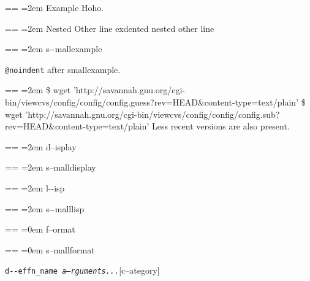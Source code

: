 \documentclass{book}
\makeatletter
\newenvironment{GNUTexinfopreformatted}{%
  \par\obeylines\obeyspaces\frenchspacing
  \parskip=\z@\parindent=\z@}{}
\makeatother
\begin{document}
\begin{titlepage}
\begin{GNUTexinfopreformatted}
\leftskip=2em\relax\ttfamily%
Example   Hoho.
\end{GNUTexinfopreformatted}
\begin{GNUTexinfopreformatted}
\leftskip=2em\relax\ttfamily%
Nested Other line
\end{GNUTexinfopreformatted}
\noindent exdented nested other line

\begin{GNUTexinfopreformatted}
\leftskip=2em\relax\ttfamily\footnotesize%
s{-}{-}mallexample
\end{GNUTexinfopreformatted}

\texttt{@noindent} after smallexample.
\begin{GNUTexinfopreformatted}
\leftskip=2em\relax\ttfamily\footnotesize%
\$ wget 'http://savannah.gnu.org/cgi-bin/viewcvs/config/config/config.guess?rev=HEAD\&content-type=text/plain'
\$ wget 'http://savannah.gnu.org/cgi-bin/viewcvs/config/config/config.sub?rev=HEAD\&content-type=text/plain'
\end{GNUTexinfopreformatted}
\noindent{}Less recent versions are also present.

\begin{GNUTexinfopreformatted}
\leftskip=2em\relax%
d--isplay
\end{GNUTexinfopreformatted}

\begin{GNUTexinfopreformatted}
\leftskip=2em\relax\footnotesize%
s--malldisplay
\end{GNUTexinfopreformatted}

\begin{GNUTexinfopreformatted}
\leftskip=2em\relax\ttfamily%
l{-}{-}isp
\end{GNUTexinfopreformatted}

\begin{GNUTexinfopreformatted}
\leftskip=2em\relax\ttfamily\footnotesize%
s{-}{-}malllisp
\end{GNUTexinfopreformatted}

\begin{GNUTexinfopreformatted}
\leftskip=0em\relax%
f--ormat
\end{GNUTexinfopreformatted}

\begin{GNUTexinfopreformatted}
\leftskip=0em\relax\footnotesize%
s--mallformat
\end{GNUTexinfopreformatted}

\noindent\texttt{d{-}{-}effn\_name \EmbracOn{}\textnormal{\textsl{a--rguments...}}\EmbracOff{}}\hfill[c--ategory]




\end{titlepage}
\end{document}
